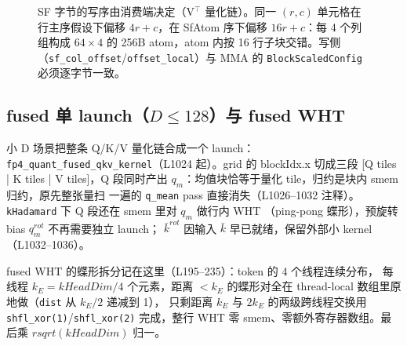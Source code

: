 \begin{figure}[H]
\caption{SF 字节的写序由消费端决定（V$^\top$ 量化链）。同一 $(r,c)$ 单元格在
行主序假设下偏移 $4r+c$，在 SfAtom 序下偏移 $16r+c$：每 4 个列组构成
$64{\times}4$ 的 256B atom，atom 内按 16 行子块交错。写侧
（\texttt{sf\_col\_offset}/\texttt{offset\_local}）与 MMA 的
\texttt{BlockScaledConfig} 必须逐字节一致。}
\label{fig:31-sf-order}
\end{figure}

\subsection{fused 单 launch（$D\le128$）与 fused WHT}

小 D 场景把整条 Q/K/V 量化链合成一个 launch：
\texttt{fp4\_quant\_fused\_qkv\_kernel}（L1024 起）。grid 的
blockIdx.x 切成三段 [Q tiles | K tiles | V tiles]，Q 段同时产出
$q_m$：均值块恰等于量化 tile，归约是块内 smem 归约，原先整张量扫
一遍的 \texttt{q\_mean} pass 直接消失（L1026--1032 注释）。
\texttt{kHadamard} 下 Q 段还在 smem 里对 $q_m$ 做行内 WHT
（ping-pong 蝶形），预旋转 bias $q_m^{rot}$ 不再需要独立 launch；
$\bar k^{rot}$ 因输入 $\bar k$ 早已就绪，保留外部小 kernel
（L1032--1036）。

fused WHT 的蝶形拆分记在这里（L195--235）：token 的 4 个线程连续分布，
每线程 $k_E=kHeadDim/4$ 个元素，距离 $<k_E$ 的蝶形对全在
thread-local 数组里原地做（\texttt{dist} 从 $k_E/2$ 递减到 1），
只剩距离 $k_E$ 与 $2k_E$ 的两级跨线程交换用
\texttt{shfl\_xor(1)}/\texttt{shfl\_xor(2)} 完成，整行 WHT 零
smem、零额外寄存器数组。最后乘 $rsqrt(kHeadDim)$ 归一。

